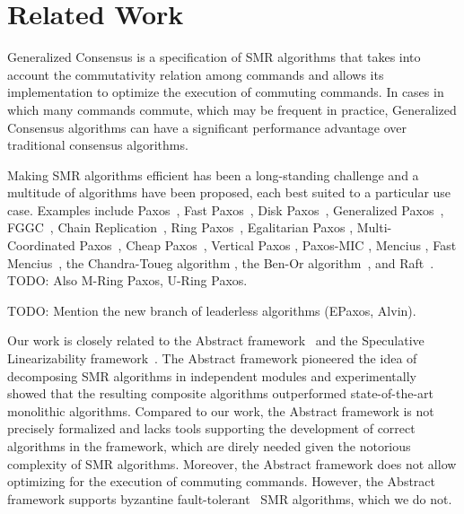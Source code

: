 \section{Related Work}
\label{sec:related}

Generalized Consensus is a specification of SMR algorithms that takes into account the commutativity relation among commands and allows its implementation to optimize the execution of commuting commands. In cases in which many commands commute, which may be frequent in practice, Generalized Consensus algorithms can have a significant performance advantage over traditional consensus algorithms.

Making SMR algorithms efficient has been a long-standing
challenge and a multitude of algorithms have been proposed, each best suited to a particular use case.
Examples include Paxos~\cite{lamport2001paxos}, Fast
Paxos~\cite{Lamport06FastPaxos}, Disk Paxos~\cite{GafniLamport03DiskPaxos},
Generalized Paxos~\cite{Lamport05GeneralizeConsensus},
FGGC~\cite{SutraShapiro11FastGenuineGeneralizedConsensus}, Chain
Replication~\cite{RenesseSchneider04ChainReplicationSupportingHighThroughputAvailability}, Ring
Paxos~\cite{MarandiETAL10RingPaxosHighthroughputAtomicBroadcastProtocol},
Egalitarian Paxos
\cite{MoraruAndersenKaminsky13ThereIsMoreConsensusEgalitarianParliaments},
Multi-Coordinated Paxos~\cite{CamargosSchmidtPedone07MulticoordinatedPaxos},
Cheap Paxos~\cite{LamportMassa04CheapPaxos}, Vertical Paxos
\cite{LamportMalkhiZhou09VerticalPaxosPrimarybackupReplication}, Paxos-MIC
\cite{HurfinMoiseNarzul11AdaptiveFastPaxosMakingQuickEverlasting}, Mencius
\cite{MaoJunqueiraMarzullo08MenciusBuildingEfficientReplicatedStateMachine},
Fast Mencius~\cite{WeiETAL13FastMenciusMenciusLowCommitLatency},
the Chandra-Toueg algorithm
\cite{ChandraToueg96UnreliableFailureDetectorsReliableDistributedSystems}, the
Ben-Or algorithm~\cite{BenOr83AnotherAdvantageFreeChoiceCompletelyAsynchronous},
and Raft~\cite{OngaroOusterhout14SearchUnderstandableConsensusAlgorithm}.
TODO\@: Also M-Ring Paxos, U-Ring Paxos.

TODO\@: Mention the new branch of leaderless algorithms (EPaxos, Alvin).


Our work is closely related to the Abstract
framework~\cite{GuerraouiETAL10Next700BftProtocols}
and the Speculative Linearizability
framework~\cite{GuerraouiKuncakLosa12SpeculativeLinearizability}. The
Abstract framework pioneered the idea of decomposing SMR algorithms in
independent modules and experimentally showed that the resulting composite
algorithms outperformed state-of-the-art monolithic algorithms. Compared
to our work, the Abstract framework is not precisely formalized and lacks
tools supporting the development of correct algorithms in the framework,
which are direly needed given the notorious complexity of SMR algorithms.
Moreover, the Abstract framework does not allow optimizing for the execution
of commuting commands. However, the Abstract framework supports byzantine
fault-tolerant~\cite{LamportShostakPease82ByzantineGeneralsProblem} SMR
algorithms, which we do not. 

